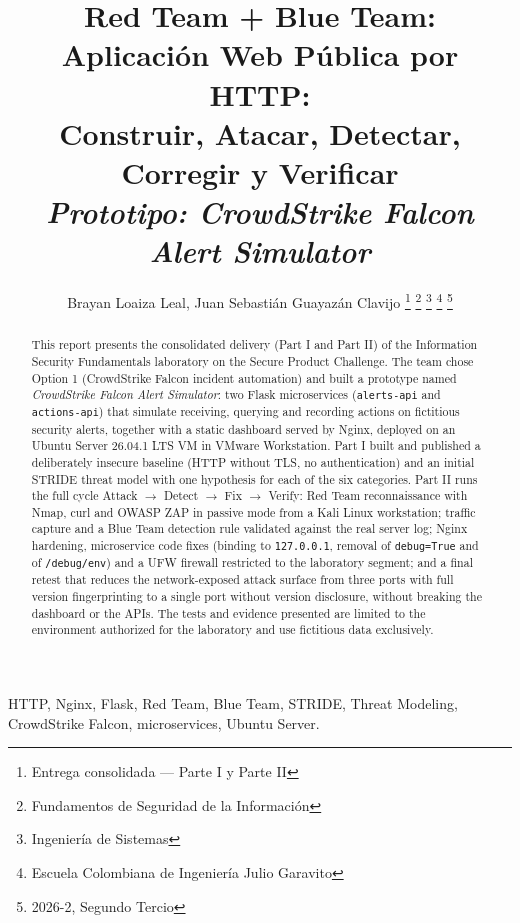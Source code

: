 \documentclass[journal]{IEEEtran}
\title{
Red Team + Blue Team: Aplicación Web Pública por HTTP:\\
Construir, Atacar, Detectar, Corregir y Verificar\\
\large \textit{Prototipo: CrowdStrike Falcon Alert Simulator}
}
\author{
Brayan Loaiza Leal,
Juan Sebastián Guayazán Clavijo
\thanks{Entrega consolidada --- Parte I y Parte II}
\thanks{Fundamentos de Seguridad de la Información}
\thanks{Ingeniería de Sistemas}
\thanks{Escuela Colombiana de Ingeniería Julio Garavito}
\thanks{2026-2, Segundo Tercio}
}
\begin{document}

\maketitle

\begin{otherlanguage}{english}
\begin{abstract}
This report presents the consolidated delivery (Part I and Part II) of the
Information Security Fundamentals laboratory on the Secure Product Challenge.
The team chose Option 1 (CrowdStrike Falcon incident automation) and built a
prototype named \textit{CrowdStrike Falcon Alert Simulator}: two Flask
microservices (\texttt{alerts-api} and \texttt{actions-api}) that simulate
receiving, querying and recording actions on fictitious security alerts,
together with a static dashboard served by Nginx, deployed on an Ubuntu Server
26.04.1 LTS VM in VMware Workstation. Part I built and published a deliberately
insecure baseline (HTTP without TLS, no authentication) and an initial STRIDE
threat model with one hypothesis for each of the six categories. Part II runs
the full cycle Attack $\rightarrow$ Detect $\rightarrow$ Fix $\rightarrow$
Verify: Red Team reconnaissance with Nmap, curl and OWASP ZAP in passive mode
from a Kali Linux workstation; traffic capture and a Blue Team detection rule
validated against the real server log; Nginx hardening, microservice code fixes
(binding to \texttt{127.0.0.1}, removal of \texttt{debug=True} and of
\texttt{/debug/env}) and a UFW firewall restricted to the laboratory segment;
and a final retest that reduces the network-exposed attack surface from three
ports with full version fingerprinting to a single port without version
disclosure, without breaking the dashboard or the APIs. The tests and evidence
presented are limited to the environment authorized for the laboratory and use
fictitious data exclusively.
\end{abstract}

\begin{IEEEkeywords}
HTTP, Nginx, Flask, Red Team, Blue Team, STRIDE, Threat Modeling,
CrowdStrike Falcon, microservices, Ubuntu Server.
\end{IEEEkeywords}
\end{otherlanguage}

\IEEEpeerreviewmaketitle
\end{document}
